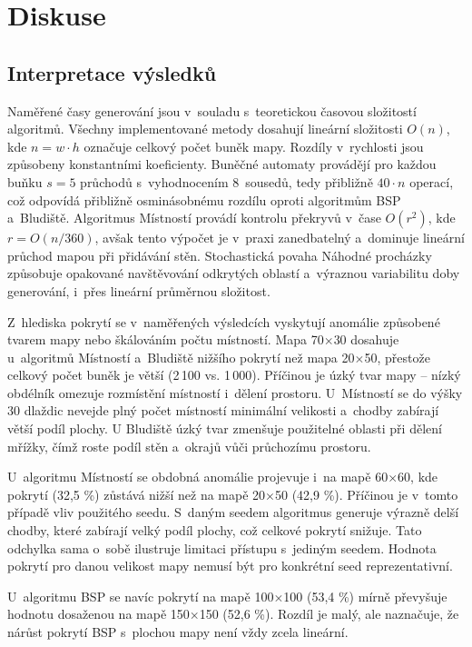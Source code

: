 \documentclass[
   program=itk,
   biblatex,
   figures=true,
   tables=true,
   glossaries,
   index
]{kidiplom}
\begin{document}
\section{Diskuse}
\label{sec:diskuse}

\subsection{Interpretace výsledků}

Naměřené časy generování jsou v~souladu s~teoretickou časovou složitostí algoritmů. Všechny implementované metody dosahují lineární složitosti $O(n)$, kde $n = w \cdot h$ označuje celkový počet buněk mapy. Rozdíly v~rychlosti jsou způsobeny konstantními koeficienty. Buněčné automaty provádějí pro každou buňku $s = 5$ průchodů s~vyhodnocením 8~sousedů, tedy přibližně $40 \cdot n$ operací, což odpovídá přibližně osminásobnému rozdílu oproti algoritmům BSP a~Bludiště. Algoritmus Místností provádí kontrolu překryvů v~čase $O(r^2)$, kde $r = O(n/360)$, avšak tento výpočet je v~praxi zanedbatelný a~dominuje lineární průchod mapou při přidávání stěn. Stochastická povaha Náhodné procházky způsobuje opakované navštěvování odkrytých oblastí a~výraznou variabilitu doby generování, i~přes lineární průměrnou složitost.

Z~hlediska pokrytí se v~naměřených výsledcích vyskytují anomálie způsobené tvarem mapy nebo škálováním počtu místností. Mapa 70$\times$30 dosahuje u~algoritmů Místností a~Bludiště nižšího pokrytí než mapa 20$\times$50, přestože celkový počet buněk je větší (2\,100 vs. 1\,000). Příčinou je úzký tvar mapy -- nízký obdélník omezuje rozmístění místností i~dělení prostoru. U~Místností se do výšky 30 dlaždic nevejde plný počet místností minimální velikosti a~chodby zabírají větší podíl plochy. U Bludiště úzký tvar zmenšuje použitelné oblasti při dělení mřížky, čímž roste podíl stěn a~okrajů vůči průchozímu prostoru.

U~algoritmu Místností se obdobná anomálie projevuje i~na mapě 60$\times$60, kde pokrytí (32,5 \%) zůstává nižší než na mapě 20$\times$50 (42,9 \%). Příčinou je v~tomto případě vliv použitého seedu. S~daným seedem algoritmus generuje výrazně delší chodby, které zabírají velký podíl plochy, což celkové pokrytí snižuje. Tato odchylka sama o~sobě ilustruje limitaci přístupu s~jediným seedem. Hodnota pokrytí pro danou velikost mapy nemusí být pro konkrétní seed reprezentativní.

U~algoritmu BSP se navíc pokrytí na mapě 100$\times$100 (53,4 \%) mírně převyšuje hodnotu dosaženou na mapě 150$\times$150 (52,6 \%). Rozdíl je malý, ale naznačuje, že nárůst pokrytí BSP s~plochou mapy není vždy zcela lineární.
\end{document}
